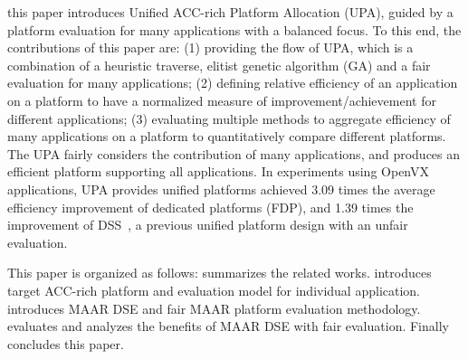 


 this paper introduces Unified ACC-rich Platform Allocation (UPA), guided by a platform evaluation for many applications with a balanced focus. To this end, the contributions of this paper are: (1) providing the flow of UPA, which is a combination of a heuristic traverse, elitist genetic algorithm (GA) and a fair evaluation for many applications; (2) defining relative efficiency of an application on a platform to have a normalized measure of improvement/achievement for different applications; (3) evaluating multiple methods to aggregate efficiency of many applications on a platform to quantitatively compare different platforms. 
The UPA fairly considers the contribution of many applications, and produces an efficient platform supporting all applications. 
In experiments using OpenVX applications, UPA provides unified platforms achieved 3.09 times the average efficiency improvement of dedicated platforms (FDP), and 1.39 times the improvement of DSS~\cite{zhang2018ds}, a previous unified platform design with an unfair evaluation. 


This paper is organized as follows:  summarizes the related works.  introduces target ACC-rich platform and evaluation model for individual application.  introduces MAAR DSE and fair MAAR platform evaluation methodology.  evaluates and analyzes the benefits of MAAR DSE with fair evaluation. Finally  concludes this paper.


